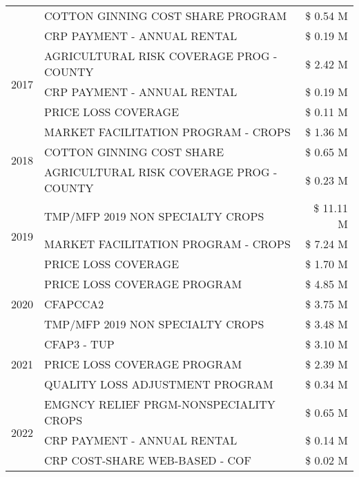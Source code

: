 \begin{tabular}{llr}
 & COTTON GINNING COST SHARE PROGRAM & \$ 0.54 M \\
 & CRP PAYMENT - ANNUAL RENTAL & \$ 0.19 M \\
\cline{1-3}
\multirow[t]{3}{*}{2017} & AGRICULTURAL RISK COVERAGE PROG - COUNTY & \$ 2.42 M \\
 & CRP PAYMENT - ANNUAL RENTAL & \$ 0.19 M \\
 & PRICE LOSS COVERAGE & \$ 0.11 M \\
\cline{1-3}
\multirow[t]{3}{*}{2018} & MARKET FACILITATION PROGRAM - CROPS & \$ 1.36 M \\
 & COTTON GINNING COST SHARE & \$ 0.65 M \\
 & AGRICULTURAL RISK COVERAGE PROG - COUNTY & \$ 0.23 M \\
\cline{1-3}
\multirow[t]{3}{*}{2019} & TMP/MFP 2019 NON SPECIALTY CROPS & \$ 11.11 M \\
 & MARKET FACILITATION PROGRAM - CROPS & \$ 7.24 M \\
 & PRICE LOSS COVERAGE & \$ 1.70 M \\
\cline{1-3}
\multirow[t]{3}{*}{2020} & PRICE LOSS COVERAGE PROGRAM & \$ 4.85 M \\
 & CFAPCCA2 & \$ 3.75 M \\
 & TMP/MFP 2019 NON SPECIALTY CROPS & \$ 3.48 M \\
\cline{1-3}
\multirow[t]{3}{*}{2021} & CFAP3 - TUP & \$ 3.10 M \\
 & PRICE LOSS COVERAGE PROGRAM & \$ 2.39 M \\
 & QUALITY LOSS ADJUSTMENT PROGRAM & \$ 0.34 M \\
\cline{1-3}
\multirow[t]{3}{*}{2022} & EMGNCY RELIEF PRGM-NONSPECIALITY CROPS & \$ 0.65 M \\
 & CRP PAYMENT - ANNUAL RENTAL & \$ 0.14 M \\
 & CRP COST-SHARE WEB-BASED - COF & \$ 0.02 M \\
\cline{1-3}
\bottomrule
\end{tabular}

